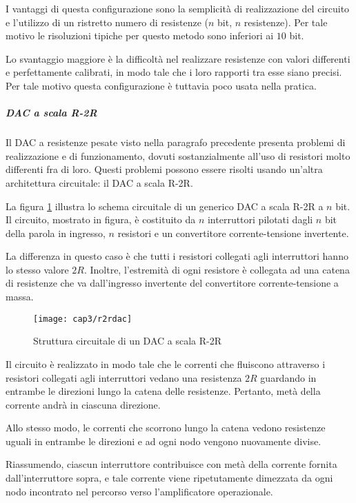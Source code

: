I vantaggi di questa configurazione sono la semplicità di realizzazione del circuito e l'utilizzo di un ristretto numero di resistenze ($n$ bit, $n$ resistenze). Per tale motivo le risoluzioni tipiche per questo metodo sono inferiori ai $10$ bit.

Lo svantaggio maggiore è la difficoltà nel realizzare resistenze con valori differenti e perfettamente calibrati, in modo tale che i loro rapporti tra esse siano precisi.
Per tale motivo questa configurazione è tuttavia poco usata nella pratica.

\subparagraph{\textbf{DAC a scala R-2R}}
Il DAC a resistenze pesate visto nella paragrafo precedente presenta problemi di realizzazione e di funzionamento, dovuti sostanzialmente all'uso di resistori molto differenti fra di loro. Questi problemi possono essere risolti usando un'altra architettura circuitale: il DAC a scala R-2R.

La figura \ref{r2rdac} illustra lo schema circuitale di un generico DAC a scala R-2R a $n$ bit.
Il circuito, mostrato in figura, è costituito da $n$ interruttori pilotati dagli $n$ bit della parola in ingresso, $n$ resistori e un convertitore corrente-tensione invertente. 

La differenza in questo caso è che tutti i resistori collegati agli interruttori hanno lo stesso valore $2R$. Inoltre, l'estremità di ogni resistore è collegata ad una catena di resistenze che va dall'ingresso invertente del convertitore corrente-tensione a massa.
\begin{figure}  
  \begin{center}
    \texttt{[image: cap3/r2rdac]}
    \caption{Struttura circuitale di un DAC a scala R-2R}
    \label{r2rdac}
  \end{center}
\end{figure}

Il circuito è realizzato in modo tale che le correnti che fluiscono attraverso i resistori collegati agli interruttori vedano una resistenza $2R$ guardando in entrambe le direzioni lungo la catena delle resistenze. Pertanto, metà della corrente andrà in ciascuna direzione. 

Allo stesso modo, le correnti che scorrono lungo la catena vedono resistenze uguali in entrambe le direzioni e ad ogni nodo vengono nuovamente divise.

Riassumendo, ciascun interruttore contribuisce con metà della corrente fornita dall'interruttore sopra, e tale corrente viene ripetutamente dimezzata da ogni nodo incontrato nel percorso verso l'amplificatore operazionale.

